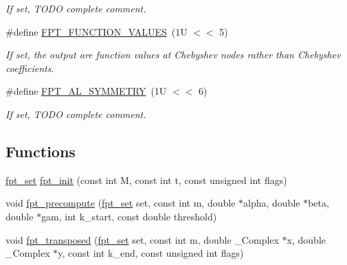 \begin{DoxyCompactItemize}
\begin{DoxyCompactList}\small\item\em If set, T\-O\-D\-O complete comment. \end{DoxyCompactList}\item 
\hypertarget{group__fpt_gad5594ac14b8a368f0103761361af5691}{\#define \hyperlink{group__fpt_gad5594ac14b8a368f0103761361af5691}{F\-P\-T\-\_\-\-F\-U\-N\-C\-T\-I\-O\-N\-\_\-\-V\-A\-L\-U\-E\-S}~(1\-U $<$$<$ 5)}\label{group__fpt_gad5594ac14b8a368f0103761361af5691}

\begin{DoxyCompactList}\small\item\em If set, the output are function values at Chebyshev nodes rather than Chebyshev coefficients. \end{DoxyCompactList}\item 
\hypertarget{group__fpt_gaba75cd704c2ca4153c1733b4cb3c977f}{\#define \hyperlink{group__fpt_gaba75cd704c2ca4153c1733b4cb3c977f}{F\-P\-T\-\_\-\-A\-L\-\_\-\-S\-Y\-M\-M\-E\-T\-R\-Y}~(1\-U $<$$<$ 6)}\label{group__fpt_gaba75cd704c2ca4153c1733b4cb3c977f}

\begin{DoxyCompactList}\small\item\em If set, T\-O\-D\-O complete comment. \end{DoxyCompactList}\end{DoxyCompactItemize}
\subsection*{Functions}
\begin{DoxyCompactItemize}
\item 
\hyperlink{nfft3_8h_a73d630ac21d6474ba0693f124d465e15}{fpt\-\_\-set} \hyperlink{group__fpt_gad103ad18c75ee5dd048392dfd1ca7305}{fpt\-\_\-init} (const int M, const int t, const unsigned int flags)
\item 
void \hyperlink{group__fpt_gad3c3b30fda57364c92958cc7390b6378}{fpt\-\_\-precompute} (\hyperlink{nfft3_8h_a73d630ac21d6474ba0693f124d465e15}{fpt\-\_\-set} set, const int m, double $\ast$alpha, double $\ast$beta, double $\ast$gam, int k\-\_\-start, const double threshold)
\item 
void \hyperlink{group__fpt_gaa2084b56c851ff0c58d10bf34a084a38}{fpt\-\_\-transposed} (\hyperlink{nfft3_8h_a73d630ac21d6474ba0693f124d465e15}{fpt\-\_\-set} set, const int m, double \-\_\-\-Complex $\ast$x, double \-\_\-\-Complex $\ast$y, const int k\-\_\-end, const unsigned int flags)
\end{DoxyCompactItemize}


